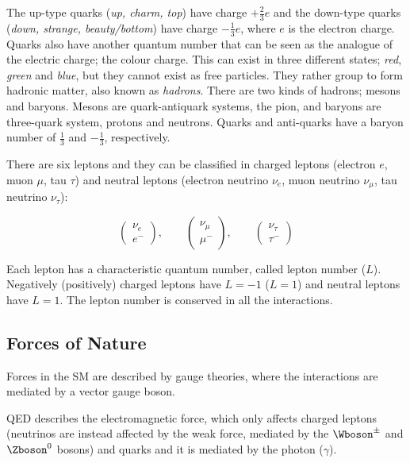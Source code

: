			\noindent The up-type quarks (\textit{up, charm, top}) have charge $+\frac{2}{3}e$ and the down-type quarks (\textit{down, strange, beauty/bottom}) have charge $-\frac{1}{3}e$, where $e$ is the electron charge. Quarks also have another quantum number that can be seen as the analogue of the electric charge; the colour charge. This can exist in three different states; \textit{red}, \textit{green} and \textit{blue}, but they cannot exist as free particles. They rather group to form hadronic matter, also known as \emph{hadrons}. There are two kinds of hadrons; mesons and baryons. Mesons are quark-antiquark systems, \eg the pion, and baryons are three-quark system, \eg protons and neutrons. Quarks and anti-quarks have a baryon number of $\frac{1}{3}$ and $-\frac{1}{3}$, respectively.

			There are six leptons and they can be classified in charged leptons (electron $e$, muon $\mu$, tau $\tau$) and neutral leptons (electron neutrino $\nu_e$, muon neutrino $\nu_{\mu}$, tau neutrino $\nu_{\tau}$):
			
			\begin{equation*}
			\label{eq:lepton_flavor_doublets}
				\begin{pmatrix} \nu_e      \\ e^-    \end{pmatrix}, \qquad
				\begin{pmatrix} \nu_{\mu}  \\ \mu^-  \end{pmatrix}, \qquad
				\begin{pmatrix} \nu_{\tau} \\ \tau^- \end{pmatrix}
			\end{equation*}

			\noindent Each lepton has a characteristic quantum number, called lepton number ($L$). Negatively (positively) charged leptons have $L=-1$ ($L=1$) and neutral leptons have $L=1$. The lepton number is conserved in all the interactions. 



		\subsection*{Forces of Nature}

			Forces in the \ac{SM} are described by gauge theories, where the interactions are mediated by a vector gauge boson. 

			\ac{QED} describes the electromagnetic force, which only affects charged leptons (neutrinos are instead affected by the weak force, mediated by the $\Wboson^{\pm}$ and $\Zboson^0$ bosons) and quarks and it is mediated by the photon ($\gamma$).

